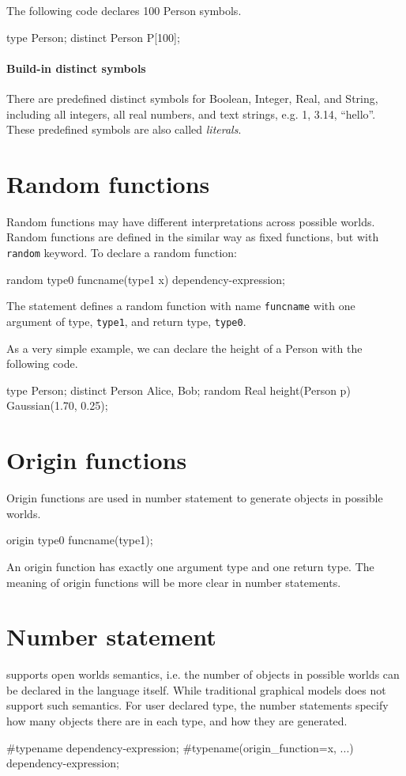\documentclass[12pt]{article}
\begin{document}
The following \bl code declares 100 Person symbols.  
\begin{blogcode}
type Person;
distinct Person P[100];
\end{blogcode}


\paragraph{Build-in distinct symbols}
There are predefined distinct symbols for Boolean, Integer,  Real, and String, including all integers, all real numbers, and text strings, e.g. 1, 3.14, ``hello''. These predefined symbols are also called {\em literals}.


\section{Random functions}
Random functions may have different interpretations across possible worlds. Random functions are defined in the similar way as fixed functions, but with \texttt{random} keyword.
To declare a random function:
\begin{blogcode}
random type0 funcname(type1 x) dependency-expression;
\end{blogcode}
The statement defines a random function with name \texttt{funcname} with one argument of type, \texttt{type1}, and return type, \texttt{type0}. 

As a very simple example, we can declare the height of a Person with the following code. 
\begin{blogcode}
type Person;
distinct Person Alice, Bob;
random Real height(Person p) ~ Gaussian(1.70, 0.25);
\end{blogcode}

\section{Origin functions}
Origin functions are used in number statement to generate objects in possible worlds. 
\begin{blogcode}
origin type0 funcname(type1);
\end{blogcode}
An origin function has exactly one argument type and one return type. 
The meaning of origin functions will be more clear in number statements. 

\section{Number statement}
\bl supports open worlds semantics, i.e. the number of objects in possible worlds can be declared in the language itself. While traditional graphical models does not support such semantics. 
For user declared type, the number statements specify how many objects there are in each type, and how they are generated. 
\begin{blogcode}
#typename dependency-expression;
#typename(origin_function=x, ...) dependency-expression;
\end{blogcode}
\end{document}
